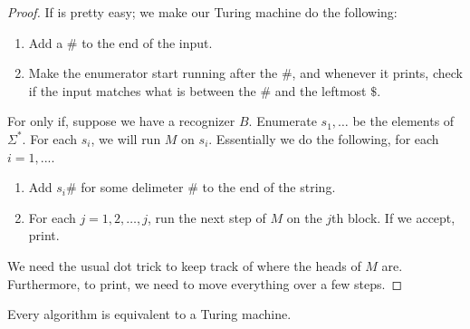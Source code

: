 \begin{proof}
	If is pretty easy; we make our Turing machine do the following:
	\begin{enumerate}
		\item Add a $\#$ to the end of the input.
		\item Make the enumerator start running after the $\#$, and whenever it prints, check if the input matches what is between the $\#$ and the leftmost $\$$. 
	\end{enumerate}
	For only if, suppose we have a recognizer $B$.
	Enumerate $s_1, \ldots$ be the elements of $\Sigma^*$. 
	For each $s_i$, we will run $M$ on $s_i$.
	Essentially we do the following, for each $i = 1, ...$.
	\begin{enumerate}
		\item Add $s_i \#$ for some delimeter $\#$ to the end of the string.
		\item For each $j = 1, 2, \ldots, j$, run the next step of $M$ on the $j$th block. If we accept, print.
	\end{enumerate}
	We need the usual dot trick to keep track of where the heads of $M$ are.
	Furthermore, to print, we need to move everything over a few steps.
\end{proof}

\begin{law}
	Every algorithm is equivalent to a Turing machine.
\end{law}



